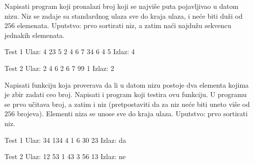 \begin{Exercise}[label=503]
  Napisati program koji pronalazi broj koji se najviše puta
  pojavljivao u datom nizu. Niz se zadaje sa standardnog ulaza sve do
  kraja ulaza, i neće biti duži od $256$ elemenata. Uputstvo: prvo
  sortirati niz, a zatim naći najdužu sekvencu jednakih elemenata.
  
\begin{miditest}
\begin{test}{Test 1}
Ulaz:   4 23 5 2 4 6 7 34 6 4 5
Izlaz:  4
\end{test}
\end{miditest}
\begin{miditest}
\begin{test}{Test 2}
Ulaz:   2 4 6 2 6 7 99 1
Izlaz:  2
\end{test}
\end{miditest}
  
\end{Exercise}

\begin{Exercise}[label=504]
  Napisati funkciju koja proverava da li u datom nizu postoje dva
  elementa kojima je zbir zadati ceo broj. Napisati i program koji
  testira ovu funkciju. U programu se prvo učitava broj, a zatim i niz
  (pretpostaviti da za niz neće biti uneto više od $256$ brojeva).
  Elementi niza se unose sve do kraja ulaza. Uputstvo: prvo sortirati
  niz.
  
\begin{miditest}
\begin{test}{Test 1}
Ulaz:   34 134 4 1 6 30 23
Izlaz:  da
\end{test}
\end{miditest}
\begin{miditest}
\begin{test}{Test 2}
Ulaz:   12 53 1 43 3 56 13
Izlaz:  ne
\end{test}
\end{miditest}
  
\end{Exercise}

